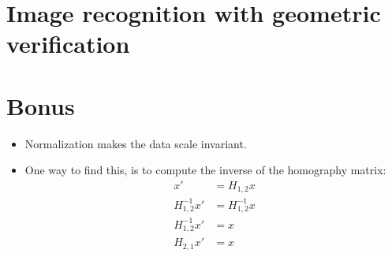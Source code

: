 \documentclass[a4paper,10pt,twoside]{article}
\begin{document}
\section{Image recognition with geometric verification}

\section{Bonus}
\begin{itemize}
    \item Normalization makes the data scale invariant.
    \item One way to find this, is to compute the inverse of the homography matrix:
      \begin{eqnarray*}
        x' &= H_{1,2} x \\
        H_{1,2}^{-1} x' &= H_{1,2}^{-1} x \\
        H_{1,2}^{-1} x' &= x \\
        H_{2,1} x' &= x
      \end{eqnarray*}
\end{itemize}
\end{document}
